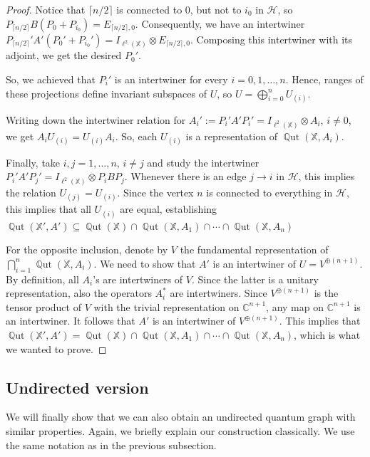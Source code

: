 \documentclass[12pt]{amsart}
\theoremstyle{definition}
\theoremstyle{definition}
\theoremstyle{definition}
\theoremstyle{definition}
\DeclareMathOperator{\Qut}{\mathbb{Q}ut}
\newcommand{\I}{{I}}
\newcommand{\X}{\mathbb{X}}
\newcommand{\Hr}{\mathcal{H}}
\numberwithin{equation}{section}
\begin{document}
\begin{proof}
Notice that $\lceil n/2\rceil$ is connected to $0$, but not to $i_0$ in $\Hr$, so $P_{\lceil n/2\rceil}B(P_0+P_{i_0})=E_{\lceil n/2\rceil,0}$. Consequently, we have an intertwiner $P_{\lceil n/2\rceil}'A'(P_0'+P_{i_0}')=\I_{\ell^2(\X)}\otimes E_{\lceil n/2\rceil,0}$. Composing this intertwiner with its adjoint, we get the desired $P_0'$.

So, we achieved that $P_i'$ is an intertwiner for every $i=0,1,\dots,n$. Hence, ranges of these projections define invariant subspaces of $U$, so $U=\bigoplus_{i=0}^n U_{(i)}$.

Writing down the intertwiner relation for $A_i':=P_i'A'P_i'=\I_{\ell^2(\X)}\otimes A_i$, $i\neq 0$, we get $A_iU_{(i)}=U_{(i)}A_i$. So, each $U_{(i)}$ is a representation of $\Qut(\X, A_i)$.

Finally, take $i, j= 1, \ldots, n$, $i\neq j$ and study the intertwiner $P_i'A'P_j'=\I_{\ell^2(\X)}\otimes P_iBP_j$. Whenever there is an edge $j\to i$ in $\Hr$, this implies the relation $U_{(j)}=U_{(i)}$. Since the vertex $n$ is connected to everything in $\Hr$, this implies that all $U_{(i)}$ are equal, establishing $\Qut(\X', A') \subseteq \Qut(\X)\cap\Qut(\X, A_1)\cap\cdots\cap\Qut(\X,A_n)$

For the opposite inclusion, denote by $V$ the fundamental representation of $\bigcap_{i=1}^n\Qut(\X, A_i)$.  We need to show that $A'$ is an intertwiner of $U=V^{\oplus (n+1)}$. By definition, all $A_i$'s are intertwiners of $V$. Since the latter is a unitary representation, also the operators $A_i^{\ast}$ are intertwiners. Since $V^{\oplus (n+1)}$ is the tensor product of $V$ with the trivial representation on $\mathbb{C}^{n+1}$, any map on $\mathbb{C}^{n+1}$ is an intertwiner. It follows that $A'$ is an intertwiner of $V^{\oplus (n+1)}$. This implies that $\Qut(\X', A') =\Qut(\X)\cap\Qut(\X, A_1)\cap\cdots\cap\Qut(\X,A_n)$, which is what we wanted to prove.
\end{proof}

\subsection{Undirected version}

We will finally show that we can also obtain an undirected quantum graph with similar properties. Again, we briefly explain our construction classically. We use the same notation as in the previous subsection.
\end{document}
